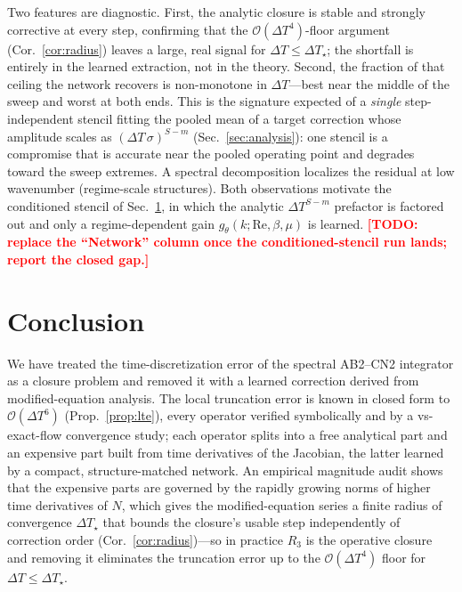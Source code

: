 \documentclass[11pt]{article}
\theoremstyle{plain}
\theoremstyle{definition}
\newcommand{\TODO}[1]{\textcolor{red}{\textbf{[TODO: #1]}}}
\newcommand{\bO}{\mathcal{O}}
\newcommand{\DT}{\Delta T}
\begin{document}
Two features are diagnostic. First, the analytic closure is stable and
strongly corrective at every step, confirming that the $\bO(\DT^4)$-floor
argument (Cor.~\ref{cor:radius}) leaves a large, real signal for
$\DT\le\DT_\star$; the shortfall is entirely in the learned extraction, not in
the theory. Second, the fraction of that ceiling the network recovers is
non-monotone in $\DT$---best near the middle of the sweep and worst at both
ends. This is the signature expected of a \emph{single} step-independent stencil
fitting the pooled mean of a target correction whose amplitude scales as
$(\DT\,\sigma)^{S-m}$ (Sec.~\ref{sec:analysis}): one stencil is a compromise
that is accurate near the pooled operating point and degrades toward the sweep
extremes. A spectral decomposition localizes the residual at low wavenumber
(regime-scale structures). Both observations motivate the conditioned stencil of
Sec.~\ref{sec:conclusion}, in which the analytic $\DT^{S-m}$ prefactor is
factored out and only a regime-dependent gain $g_\theta(k;\mathrm{Re},\beta,\mu)$
is learned. \TODO{replace the ``Network'' column once the conditioned-stencil
run lands; report the closed gap.}

\section{Conclusion}
\label{sec:conclusion}
We have treated the time-discretization error of the spectral AB2--CN2
integrator as a closure problem and removed it with a learned correction
derived from modified-equation analysis. The local truncation error is known
in closed form to $\bO(\DT^6)$ (Prop.~\ref{prop:lte}), every operator verified
symbolically and by a vs-exact-flow convergence study; each operator splits
into a free analytical part and an expensive part built from time derivatives
of the Jacobian, the latter learned by a compact, structure-matched network.
An empirical magnitude audit shows that the expensive parts are governed by the
rapidly growing norms of higher time derivatives of $N$, which gives the
modified-equation series a finite radius of convergence $\DT_\star$ that
bounds the closure's usable step independently of correction order
(Cor.~\ref{cor:radius})---so in practice $R_3$ is the operative closure and
removing it eliminates the truncation error up to the $\bO(\DT^4)$ floor for
$\DT\le\DT_\star$.
\end{document}
